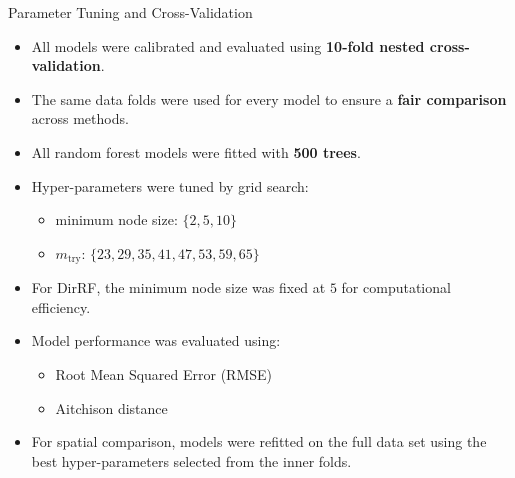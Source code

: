 \begin{frame}{Parameter Tuning and Cross-Validation}

\begin{itemize}[label=\textbullet]
  \item All models were calibrated and evaluated using \textbf{10-fold nested cross-validation}.
  \vspace{0.5em}
  \item The same data folds were used for every model to ensure a \textbf{fair comparison} across methods.
  \vspace{0.5em}
  \item All random forest models were fitted with \textbf{500 trees}.
  \vspace{0.5em}
  \item Hyper-parameters were tuned by grid search:
    \begin{itemize}[label=\textbullet]
      \item minimum node size: $\{2, 5, 10\}$
      \item $m_{\mathrm{try}}$: $\{23, 29, 35, 41, 47, 53, 59, 65\}$
    \end{itemize}
  \vspace{0.5em}
  \item For DirRF, the minimum node size was fixed at $5$ for computational efficiency.
  \vspace{0.5em}
  \item Model performance was evaluated using:
    \begin{itemize}[label=\textbullet]
      \item Root Mean Squared Error (RMSE)
      \item Aitchison distance
    \end{itemize}
  \vspace{0.5em}
  \item For spatial comparison, models were refitted on the full data set using the best hyper-parameters selected from the inner folds.
\end{itemize}

\end{frame}


